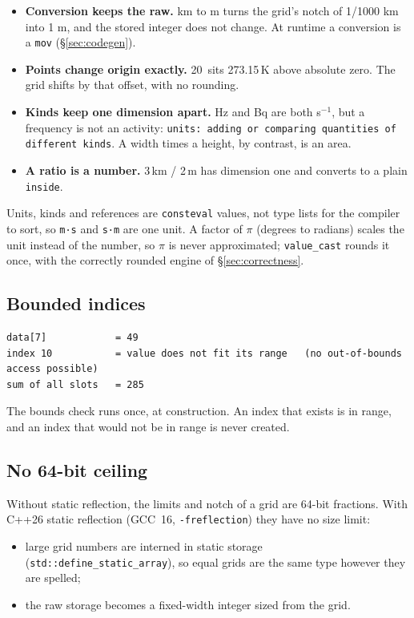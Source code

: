 \documentclass[11pt,a4paper]{article}
\newcommand{\code}[1]{\texttt{\small #1}}
\begin{document}
\begin{itemize}
\item \textbf{Conversion keeps the raw.} km to m turns the grid's notch of
      1/1000 km into 1 m, and the stored integer does not change. At runtime a
      conversion is a \code{mov} (\S\ref{sec:codegen}).
\item \textbf{Points change origin exactly.} 20\,\textcelsius{} sits 273.15\,K
      above absolute zero. The grid shifts by that offset, with no rounding.
\item \textbf{Kinds keep one dimension apart.} Hz and Bq are both s$^{-1}$,
      but a frequency is not an activity:
      \code{units: adding or comparing quantities of different kinds}. A width
      times a height, by contrast, is an area.
\item \textbf{A ratio is a number.} 3\,km / 2\,m has dimension one and
      converts to a plain \code{inside}.
\end{itemize}

\noindent
Units, kinds and references are \code{consteval} values, not type lists for
the compiler to sort, so \code{m·s} and \code{s·m} are one unit. A factor of
$\pi$ (degrees to radians) scales the unit instead of the number, so $\pi$ is
never approximated; \code{value\_cast} rounds it once, with the correctly
rounded engine of \S\ref{sec:correctness}.

\subsection{Bounded indices}


\begin{lstlisting}[style=term]
data[7]            = 49
index 10           = value does not fit its range   (no out-of-bounds access possible)
sum of all slots   = 285
\end{lstlisting}

\noindent
The bounds check runs once, at construction. An index that exists is in range,
and an index that would not be in range is never created.

\subsection{No 64-bit ceiling}\label{sec:noceiling}

Without static reflection, the limits and notch of a grid are 64-bit fractions.
With C++26 static reflection (GCC~16, \code{-freflection}) they have no size
limit:
\begin{itemize}
\item large grid numbers are interned in static storage
      (\code{std::define\_static\_array}), so equal grids are the same type
      however they are spelled;
\item the raw storage becomes a fixed-width integer sized from the grid.
\end{itemize}
\end{document}
